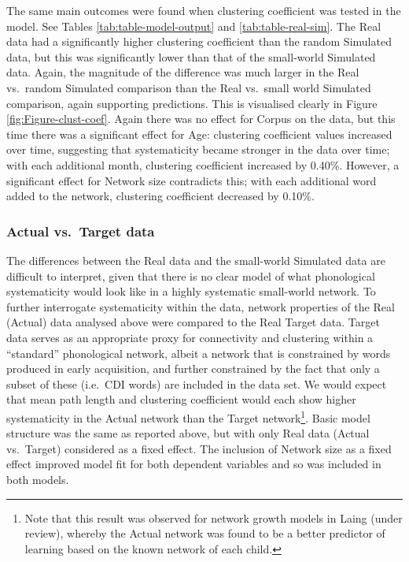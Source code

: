 \documentclass[
  man]{apa6}
\begin{document}
The same main outcomes were found when clustering coefficient was tested in the model. See Tables \ref{tab:table-model-output} and \ref{tab:table-real-sim}. The Real data had a significantly higher clustering coefficient than the random Simulated data, but this was significantly lower than that of the small-world Simulated data. Again, the magnitude of the difference was much larger in the Real vs.~random Simulated comparison than the Real vs.~small world Simulated comparison, again supporting predictions. This is visualised clearly in Figure \ref{fig:Figure-clust-coef}. Again there was no effect for Corpus on the data, but this time there was a significant effect for Age: clustering coefficient values increased over time, suggesting that systematicity became stronger in the data over time; with each additional month, clustering coefficient increased by 0.40\%. However, a significant effect for Network size contradicts this; with each additional word added to the network, clustering coefficient decreased by 0.10\%.

\hypertarget{actual-vs.-target-data}{%
\subsubsection{Actual vs.~Target data}\label{actual-vs.-target-data}}

The differences between the Real data and the small-world Simulated data are difficult to interpret, given that there is no clear model of what phonological systematicity would look like in a highly systematic small-world network. To further interrogate systematicity within the data, network properties of the Real (Actual) data analysed above were compared to the Real Target data. Target data serves as an appropriate proxy for connectivity and clustering within a ``standard'' phonological network, albeit a network that is constrained by words produced in early acquisition, and further constrained by the fact that only a subset of these (i.e.~CDI words) are included in the data set. We would expect that mean path length and clustering coefficient would each show higher systematicity in the Actual network than the Target network\footnote{Note that this result was observed for network growth models in Laing (under review), whereby the Actual network was found to be a better predictor of learning based on the known network of each child.}. Basic model structure was the same as reported above, but with only Real data (Actual vs.~Target) considered as a fixed effect. The inclusion of Network size as a fixed effect improved model fit for both dependent variables and so was included in both models.
\end{document}
